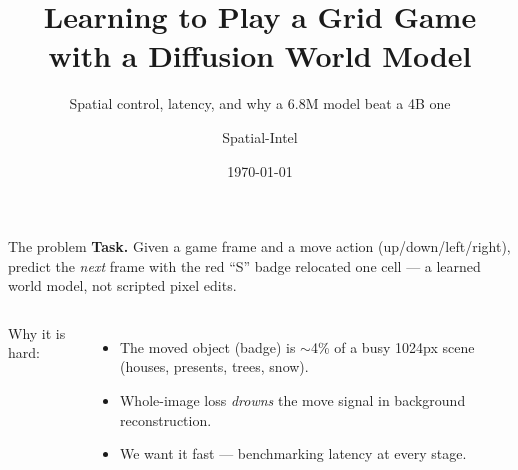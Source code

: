 \documentclass[aspectratio=169,11pt]{beamer}
\title{Learning to Play a Grid Game with a Diffusion World Model}
\subtitle{Spatial control, latency, and why a 6.8M model beat a 4B one}
\author{Spatial-Intel}
\date{\today}
\institute{Santa's Gift Journey \textbullet\ next-frame prediction from (frame, action)}
\begin{document}
\maketitle

\begin{frame}{The problem}
  \textbf{Task.} Given a game frame and a move action (up/down/left/right),
  predict the \emph{next} frame with the red ``S'' badge relocated one cell ---
  a learned \alert{world model}, not scripted pixel edits.

  \vspace{0.6em}
  \begin{columns}[T]
      Why it is hard:
      \begin{itemize}
        \item The moved object (badge) is \alert{$\sim$4\%} of a busy 1024px scene
              (houses, presents, trees, snow).
        \item Whole-image loss \emph{drowns} the move signal in background reconstruction.
        \item We want it \alert{fast} --- benchmarking latency at every stage.
      \end{itemize}
      \centering
  \end{columns}
\end{frame}

\end{document}
